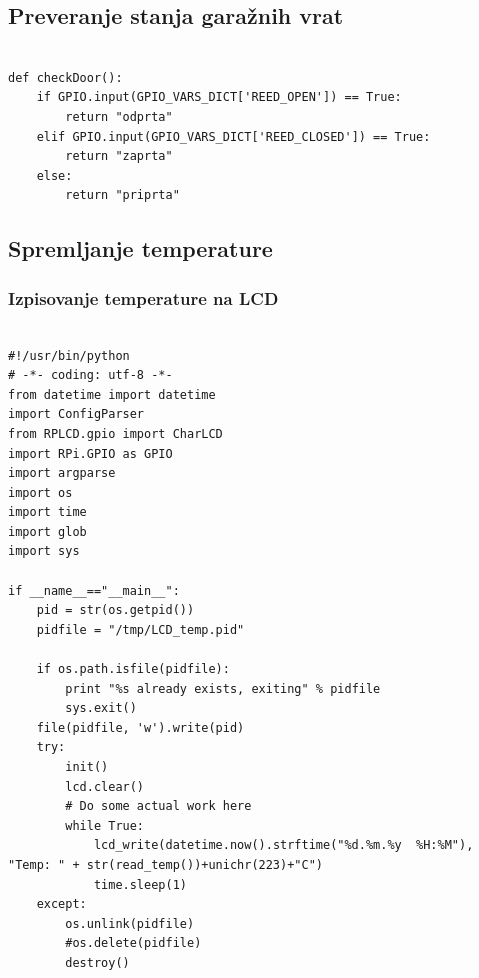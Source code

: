 \documentclass[11pt]{article}
\begin{document}
\subsection{Preveranje stanja garažnih vrat}
\begin{verbatim}
  
def checkDoor():
    if GPIO.input(GPIO_VARS_DICT['REED_OPEN']) == True:
        return "odprta"
    elif GPIO.input(GPIO_VARS_DICT['REED_CLOSED']) == True:
        return "zaprta"
    else:
        return "priprta"
\end{verbatim}
\subsection{Spremljanje temperature}

\subsubsection{Izpisovanje temperature na LCD}
\begin{verbatim}
  
#!/usr/bin/python
# -*- coding: utf-8 -*-
from datetime import datetime
import ConfigParser
from RPLCD.gpio import CharLCD
import RPi.GPIO as GPIO
import argparse
import os
import time
import glob
import sys

if __name__=="__main__":
    pid = str(os.getpid())
    pidfile = "/tmp/LCD_temp.pid"

    if os.path.isfile(pidfile):
        print "%s already exists, exiting" % pidfile
        sys.exit()
    file(pidfile, 'w').write(pid)
    try:
        init()
        lcd.clear()
        # Do some actual work here
        while True:
        	lcd_write(datetime.now().strftime("%d.%m.%y  %H:%M"), "Temp: " + str(read_temp())+unichr(223)+"C")
        	time.sleep(1)
    except:
        os.unlink(pidfile)
        #os.delete(pidfile)
        destroy()
\end{verbatim}
\end{document}

